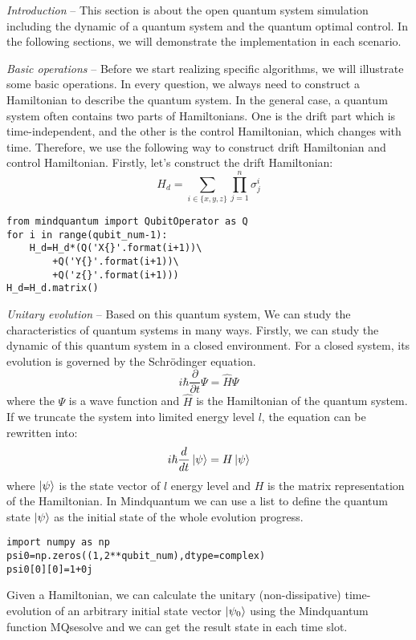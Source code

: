 \textit{Introduction} -- This section is about the open quantum system simulation including the dynamic of a quantum system and the quantum optimal control. In the following sections, we will demonstrate the implementation in each scenario.

\textit{Basic operations} -- Before we start realizing specific algorithms, we will illustrate some basic operations. In every question, we always need to construct a Hamiltonian to describe the quantum system. In the general case, a quantum system often contains two parts of Hamiltonians. One is the drift part which is time-independent, and the other is the control Hamiltonian, which changes with time. Therefore, we use the following way to construct drift Hamiltonian and control Hamiltonian. Firstly, let's construct the drift Hamiltonian:
\begin{equation}
    H_{d}=\sum_{i\in\{x,y,z\}}\prod_{j=1}^{n}\sigma_{j}^{i}
\end{equation}
\begin{lstlisting}
from mindquantum import QubitOperator as Q
for i in range(qubit_num-1):
    H_d=H_d*(Q('X{}'.format(i+1))\
        +Q('Y{}'.format(i+1))\
        +Q('z{}'.format(i+1)))
H_d=H_d.matrix()
\end{lstlisting}
\textit{Unitary evolution} -- Based on this quantum system, We can study the characteristics of quantum systems in many ways. Firstly, we can study the dynamic of this quantum system in a closed environment. For a closed system, its evolution is governed by the Schrödinger equation.
\begin{equation}
    i\hbar\frac{\partial}{\partial t}\Psi=\hat{H}\Psi
\end{equation}
where the $\Psi$ is a wave function and $\hat{H}$ is the Hamiltonian of the quantum system. If we truncate the system into limited energy level $l$, the equation can be rewritten into:
\begin{equation}
    i\hbar\frac{d}{dt}\ket{\psi}=H\ket{\psi}
    \label{shro}
\end{equation}
where $\ket{\psi}$ is the state vector of $l$ energy level and $H$ is the matrix representation of the Hamiltonian. In Mindquantum we can use a list to define the quantum state $\ket{\psi}$ as the initial state of the whole evolution progress. 
\begin{lstlisting}
import numpy as np
psi0=np.zeros((1,2**qubit_num),dtype=complex)
psi0[0][0]=1+0j
\end{lstlisting}
Given a Hamiltonian, we can calculate the unitary (non-dissipative) time-evolution of an arbitrary initial state vector $\ket{\psi_{0}}$ using the Mindquantum function MQsesolve and we can get the result state in each time slot.
